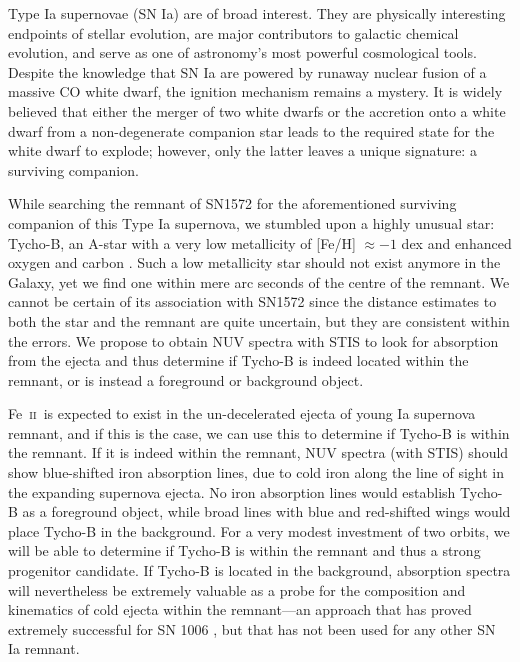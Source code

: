 \documentclass[12pt]{article}
\newcommand{\feii}{Fe~\textsc{ii}}
\begin{document}
%
%
\justification

Type Ia supernovae (SN Ia) are of broad interest. They are physically interesting endpoints of stellar evolution, are major contributors to galactic chemical evolution, and serve as one of astronomy's most powerful cosmological tools. 
Despite the knowledge that SN Ia are powered by runaway nuclear fusion of a massive CO white dwarf, the ignition mechanism remains a mystery. It is widely believed that either the merger of two white dwarfs or the accretion onto a white dwarf from a non-degenerate companion star leads to the required state for the white dwarf to explode; however, only the latter leaves a unique signature: a surviving companion.

While searching the remnant of SN1572 for the aforementioned surviving companion of this Type Ia supernova,  we stumbled upon a highly unusual star: Tycho-B, an A-star with a very low metallicity of [Fe/H] $\approx -1$ dex \citep{2012arXiv1210.2713K} and enhanced oxygen and carbon \citep{2012arXiv1210.2713K}. Such a low metallicity star should not exist anymore in the Galaxy, yet we find one within mere arc seconds of the centre of the remnant. We cannot be certain of its association with SN1572 since the distance estimates to both the star and the remnant are quite uncertain, but they are consistent within the errors.   We propose to obtain NUV spectra with STIS  to look for absorption from the ejecta and thus determine if Tycho-B is indeed located within the remnant,  or is instead a foreground or background object.

\feii\ is expected to exist in the un-decelerated ejecta of young Ia supernova remnant, and if this is the case, we can use this  to determine if Tycho-B is within the remnant.
If it is indeed within the remnant, NUV spectra (with STIS) should show blue-shifted iron absorption lines, due to cold iron along the line of sight in the  expanding supernova ejecta. No iron absorption lines would establish Tycho-B as a foreground object, while broad lines with blue and red-shifted wings would place Tycho-B in the background. For a very modest investment of two orbits, we will be able to determine if Tycho-B is within the remnant and thus a strong progenitor candidate. If Tycho-B is located in the background, absorption spectra will nevertheless be extremely valuable as a probe for the composition and kinematics of cold ejecta within the remnant---an approach that has proved extremely successful for SN 1006 \citep[e.g.][]{1988ApJ...327..164F,1993ApJ...416..247W,2005ApJ...624..189W}, but that has not been used for any other SN Ia remnant.
\end{document}
